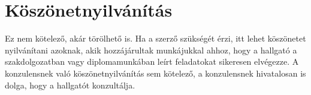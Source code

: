 \chapter*{Köszönetnyilvánítás}

Ez nem kötelező, akár törölhető is. Ha a szerző szükségét érzi, itt lehet köszönetet nyilvánítani azoknak, akik hozzájárultak munkájukkal ahhoz, hogy a hallgató a szakdolgozatban vagy diplomamunkában leírt feladatokat sikeresen elvégezze. A konzulensnek való köszönetnyilvánítás sem kötelező, a konzulensnek hivatalosan is dolga, hogy a hallgatót konzultálja.